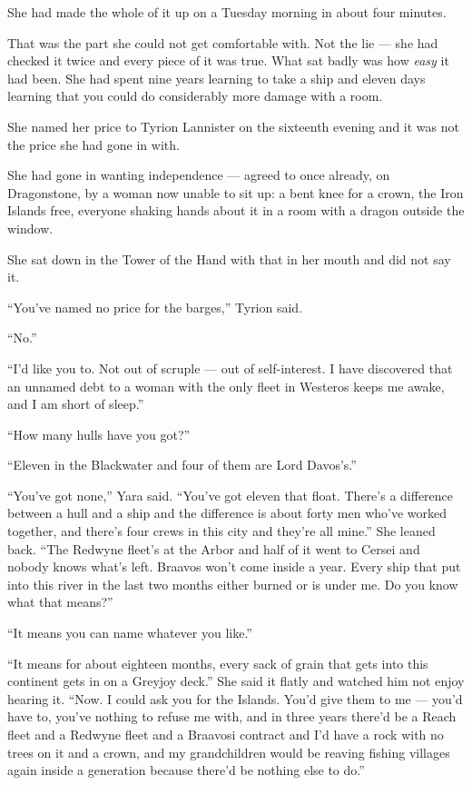 She had made the whole of it up on a Tuesday morning in about four minutes.

That was the part she could not get comfortable with. Not the lie — she had checked it twice and every piece of it was true. What sat badly was how \textit{easy} it had been. She had spent nine years learning to take a ship and eleven days learning that you could do considerably more damage with a room.

\sceneBreak

She named her price to Tyrion Lannister on the sixteenth evening and it was not the price she had gone in with.

She had gone in wanting independence — agreed to once already, on Dragonstone, by a woman now unable to sit up: a bent knee for a crown, the Iron Islands free, everyone shaking hands about it in a room with a dragon outside the window.

She sat down in the Tower of the Hand with that in her mouth and did not say it.

“You’ve named no price for the barges,” Tyrion said.

“No.”

“I’d like you to. Not out of scruple — out of self-interest. I have discovered that an unnamed debt to a woman with the only fleet in Westeros keeps me awake, and I am short of sleep.”

“How many hulls have you got?”

“Eleven in the Blackwater and four of them are Lord Davos’s.”

“You’ve got none,” Yara said. “You’ve got eleven that float. There’s a difference between a hull and a ship and the difference is about forty men who’ve worked together, and there’s four crews in this city and they’re all mine.” She leaned back. “The Redwyne fleet’s at the Arbor and half of it went to Cersei and nobody knows what’s left. Braavos won’t come inside a year. Every ship that put into this river in the last two months either burned or is under me. Do you know what that means?”

“It means you can name whatever you like.”

“It means for about eighteen months, every sack of grain that gets into this continent gets in on a Greyjoy deck.” She said it flatly and watched him not enjoy hearing it. “Now. I could ask you for the Islands. You’d give them to me — you’d have to, you’ve nothing to refuse me with, and in three years there’d be a Reach fleet and a Redwyne fleet and a Braavosi contract and I’d have a rock with no trees on it and a crown, and my grandchildren would be reaving fishing villages again inside a generation because there’d be nothing else to do.”

